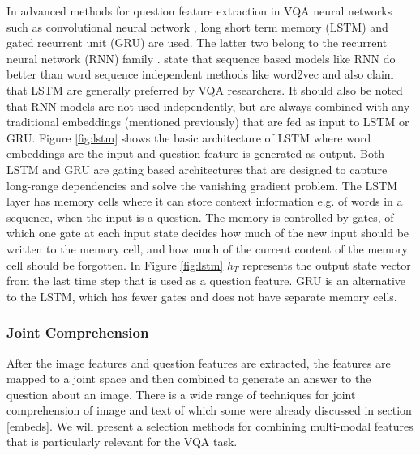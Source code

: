 \documentclass{article}
\begin{document}
In advanced methods for question feature extraction in VQA neural networks such as convolutional neural network \citep{krizhevsky2012imagenet}, long short term memory (LSTM) \citep{lstm} and gated recurrent unit (GRU) \citep{cho2014gru} are used. The latter two belong to the recurrent neural network (RNN) family \citep{elman1990finding}. \cite{young2018recent} state that sequence based models like RNN do better than word sequence independent methods like word2vec and also claim that LSTM are generally preferred by VQA researchers. It should also be noted that RNN models are not used independently, but are always combined with any traditional embeddings (mentioned previously) that are fed as input to LSTM or GRU. Figure \ref{fig:lstm} shows the basic architecture of LSTM where word embeddings are the input and question feature is generated as output. Both LSTM and GRU are gating based architectures that are designed to capture long-range dependencies and solve the vanishing gradient problem. The LSTM layer has memory cells where it can store context information e.g. of words in a sequence, when the input is a question. The memory is controlled by gates, of which one gate at each input state decides how much of the new input should be written to the memory cell, and how much of the current content of the memory cell should be forgotten. In Figure \ref{fig:lstm} $h_T$ represents the output state vector from the last time step that is used as a question feature. GRU is an alternative to the LSTM, which has fewer gates and does not have separate memory cells.

\subsubsection{Joint Comprehension} \label{attention}

After the image features and question features are extracted, the features are mapped to a joint space and then combined to generate an answer to the question about an image. There is a wide range of techniques for joint comprehension of image and text of which some were already discussed in section \ref{embeds}. We will present a selection methods for combining multi-modal features that is particularly relevant for the VQA task.
\end{document}
